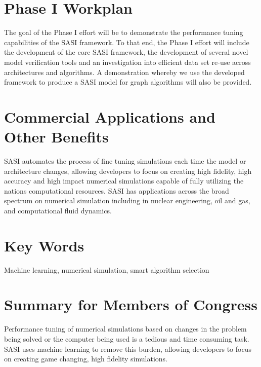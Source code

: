 \section*{Phase I Workplan}

The goal of the Phase I effort will be to demonstrate the performance tuning capabilities of the SASI framework. To that end, the Phase I effort will include the development of the core SASI framework, the development of several novel model verification tools and an investigation into efficient data set re-use across architectures and algorithms. A demonstration whereby we use the developed framework to produce a SASI model for graph algorithms will also be provided. 

\section*{Commercial Applications and Other Benefits}
SASI automates the process of fine tuning simulations each time the model or 
architecture changes, allowing developers to focus on creating high fidelity, high 
accuracy and high impact numerical simulations capable of fully utilizing the nations 
computational resources. SASI has applications across the broad spectrum on numerical simulation
including in nuclear engineering, oil and gas, and computational fluid dynamics. 

\section*{Key Words}
Machine learning, numerical simulation, smart algorithm selection

\section*{Summary for Members of Congress}
Performance tuning of numerical simulations based on changes in the problem being solved or the computer 
being used is a tedious and time consuming task. SASI uses machine learning to remove this burden, allowing 
developers to focus on creating game changing, high fidelity simulations. 

